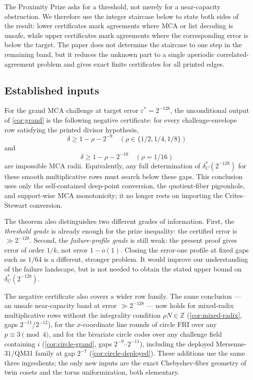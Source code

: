 \documentclass[11pt]{article}
\theoremstyle{definition}
\theoremstyle{remark}
\begin{document}
The Proximity Prize asks for a threshold, not merely for a near-capacity
obstruction.  We therefore use the integer staircase below to state both sides
of the result: lower certificates mark agreements where MCA or list decoding is
unsafe, while upper certificates mark agreements where the corresponding error
is below the target.  The paper does not determine the staircase to one step in
the remaining band, but it reduces the unknown part to a single aperiodic
correlated-agreement problem and gives exact finite certificates for all
printed edges.

\subsection{Established inputs}

For the grand MCA challenge at target error $\varepsilon^*=2^{-128}$, the
unconditional output of \cref{cor:grand} is the following negative certificate:
for every challenge-envelope row satisfying the printed divisor hypothesis,
\[
        \delta\ge 1-\rho-2^{-9}
        \quad(\rho\in\{1/2,1/4,1/8\})
\]
and
\[
        \delta\ge 1-\rho-2^{-10}
        \quad(\rho=1/16)
\]
are impossible MCA radii.  Equivalently, any full determination of
$\delta_C^*(2^{-128})$ for these smooth multiplicative rows must search below
these gaps.  This conclusion uses only the self-contained deep-point conversion,
the quotient-fiber pigeonhole, and support-wise MCA monotonicity; it no longer
rests on importing the Crites--Stewart conversion.

The theorem also distinguishes two different grades of information.  First, the
\emph{threshold grade} is already enough for the prize inequality: the certified
error is $\gg2^{-128}$.  Second, the \emph{failure-profile grade} is still weak:
the present proof gives error of order $1/k$, not error $1-o(1)$.  Closing the
error-one profile at fixed gaps such as $1/64$ is a different, stronger problem.
It would improve our understanding of the failure landscape, but is not needed
to obtain the stated upper bound on $\delta_C^*(2^{-128})$.

The negative certificate also covers a wider row family.  The
same conclusion --- an unsafe near-capacity band at error $\gg2^{-128}$ ---
now holds for mixed-radix multiplicative rows without the integrality
condition $\rho N\in\mathbb Z$ (\cref{cor:mixed-radix}, gaps
$2^{-11}$/$2^{-12}$), for the $x$-coordinate line rounds of circle FRI over
any $p\equiv3\pmod4$, and for the bivariate circle codes over any challenge
field containing $i$ (\cref{cor:circle-grand}, gaps $2^{-9}$--$2^{-11}$),
including the deployed Mersenne-$31$/QM31 family at gap $2^{-7}$
(\cref{cor:circle-deployed}).  These additions use the same three
ingredients; the only new inputs are the exact Chebyshev-fiber geometry of
twin cosets and the torus uniformization, both elementary.
\end{document}
